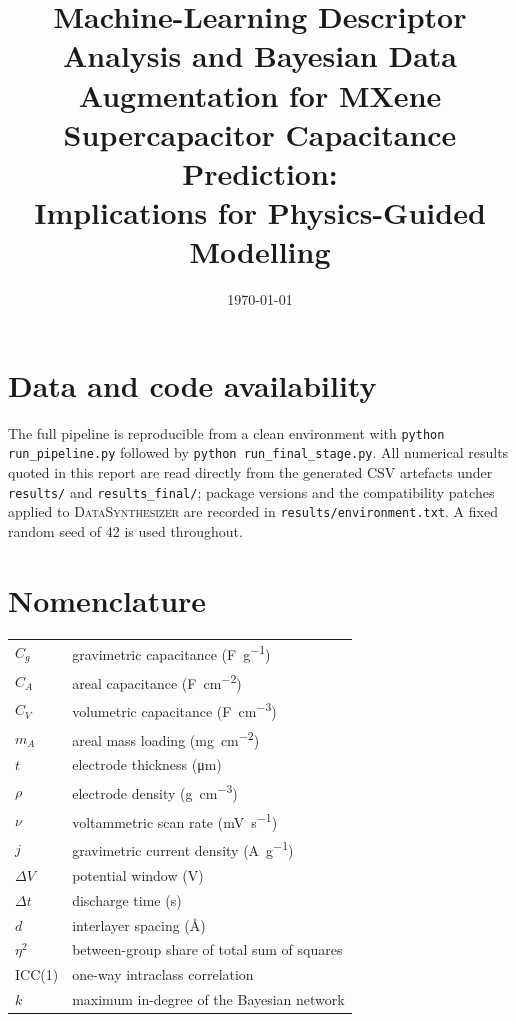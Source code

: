 \documentclass[10pt,twoside]{article}
\title{\bfseries Machine-Learning Descriptor Analysis and Bayesian Data
Augmentation for MXene Supercapacitor Capacitance Prediction:\\
Implications for Physics-Guided Modelling}
\author{}
\date{\today}
\begin{document}
\maketitle
\thispagestyle{empty}

















\section*{Data and code availability}
The full pipeline is reproducible from a clean environment with
\texttt{python run\_pipeline.py} followed by \texttt{python run\_final\_stage.py}.
All numerical results quoted in this report are read directly from the generated
CSV artefacts under \texttt{results/} and \texttt{results\_final/}; package versions
and the compatibility patches applied to \textsc{DataSynthesizer} are recorded in
\texttt{results/environment.txt}. A fixed random seed of 42 is used throughout.

\section*{Nomenclature}
\begin{tabular}{ll}
\toprule
$C_g$ & gravimetric capacitance (\si{\farad\per\gram}) \\
$C_A$ & areal capacitance (\si{\farad\per\square\centi\meter}) \\
$C_V$ & volumetric capacitance (\si{\farad\per\cubic\centi\meter}) \\
$m_A$ & areal mass loading (\si{\milli\gram\per\square\centi\meter}) \\
$t$ & electrode thickness (\si{\micro\meter}) \\
$\rho$ & electrode density (\si{\gram\per\cubic\centi\meter}) \\
$\nu$ & voltammetric scan rate (\si{\milli\volt\per\second}) \\
$j$ & gravimetric current density (\si{\ampere\per\gram}) \\
$\Delta V$ & potential window (\si{\volt}) \\
$\Delta t$ & discharge time (\si{\second}) \\
$d$ & interlayer spacing (\si{\angstrom}) \\
$\eta^2$ & between-group share of total sum of squares \\
ICC(1) & one-way intraclass correlation \\
$k$ & maximum in-degree of the Bayesian network \\
\bottomrule
\end{tabular}



\end{document}
